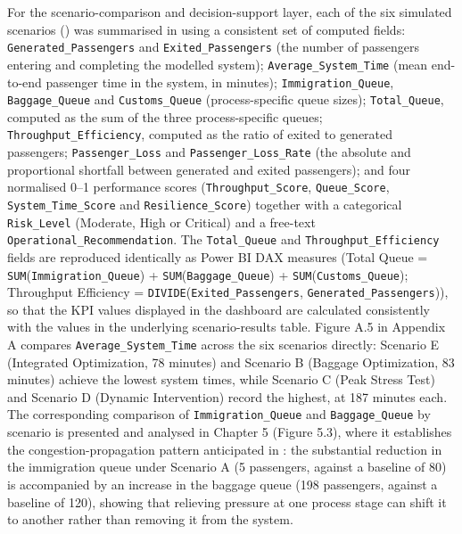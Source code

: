 For the scenario-comparison and decision-support layer, each of the six simulated scenarios () was summarised in  using a consistent set of computed fields: \nolinkurl{Generated_Passengers} and \nolinkurl{Exited_Passengers} (the number of passengers entering and completing the modelled system); \nolinkurl{Average_System_Time} (mean end-to-end passenger time in the system, in minutes); \nolinkurl{Immigration_Queue}, \nolinkurl{Baggage_Queue} and \nolinkurl{Customs_Queue} (process-specific queue sizes); \nolinkurl{Total_Queue}, computed as the sum of the three process-specific queues; \nolinkurl{Throughput_Efficiency}, computed as the ratio of exited to generated passengers; \nolinkurl{Passenger_Loss} and \nolinkurl{Passenger_Loss_Rate} (the absolute and proportional shortfall between generated and exited passengers); and four normalised 0--1 performance scores (\nolinkurl{Throughput_Score}, \nolinkurl{Queue_Score}, \nolinkurl{System_Time_Score} and \nolinkurl{Resilience_Score}) together with a categorical \nolinkurl{Risk_Level} (Moderate, High or Critical) and a free-text \nolinkurl{Operational_Recommendation}. The \nolinkurl{Total_Queue} and \nolinkurl{Throughput_Efficiency} fields are reproduced identically as Power BI DAX measures (Total Queue = \texttt{SUM}(\nolinkurl{Immigration_Queue}) + \texttt{SUM}(\nolinkurl{Baggage_Queue}) + \texttt{SUM}(\nolinkurl{Customs_Queue}); Throughput Efficiency = \texttt{DIVIDE}(\nolinkurl{Exited_Passengers}, \nolinkurl{Generated_Passengers})), so that the KPI values displayed in the dashboard are calculated consistently with the values in the underlying scenario-results table. Figure A.5 in Appendix A compares \nolinkurl{Average_System_Time} across the six scenarios directly: Scenario E (Integrated Optimization, 78 minutes) and Scenario B (Baggage Optimization, 83 minutes) achieve the lowest system times, while Scenario C (Peak Stress Test) and Scenario D (Dynamic Intervention) record the highest, at 187 minutes each. The corresponding comparison of \nolinkurl{Immigration_Queue} and \nolinkurl{Baggage_Queue} by scenario is presented and analysed in Chapter 5 (Figure 5.3), where it establishes the congestion-propagation pattern anticipated in : the substantial reduction in the immigration queue under Scenario A (5 passengers, against a baseline of 80) is accompanied by an increase in the baggage queue (198 passengers, against a baseline of 120), showing that relieving pressure at one process stage can shift it to another rather than removing it from the system.


